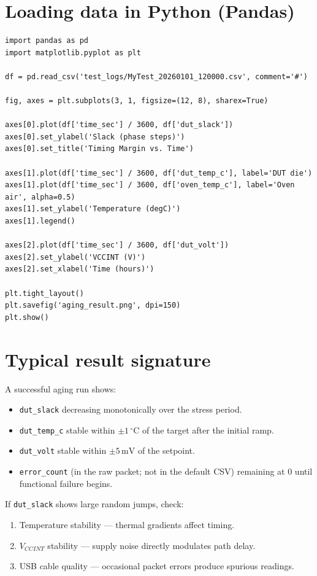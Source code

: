 \documentclass[12pt, a4paper]{report}
\begin{document}
\section{Loading data in Python (Pandas)}

\begin{lstlisting}[style=python, caption={Loading and plotting dut\_slack over time}]
import pandas as pd
import matplotlib.pyplot as plt

df = pd.read_csv('test_logs/MyTest_20260101_120000.csv', comment='#')

fig, axes = plt.subplots(3, 1, figsize=(12, 8), sharex=True)

axes[0].plot(df['time_sec'] / 3600, df['dut_slack'])
axes[0].set_ylabel('Slack (phase steps)')
axes[0].set_title('Timing Margin vs. Time')

axes[1].plot(df['time_sec'] / 3600, df['dut_temp_c'], label='DUT die')
axes[1].plot(df['time_sec'] / 3600, df['oven_temp_c'], label='Oven air', alpha=0.5)
axes[1].set_ylabel('Temperature (degC)')
axes[1].legend()

axes[2].plot(df['time_sec'] / 3600, df['dut_volt'])
axes[2].set_ylabel('VCCINT (V)')
axes[2].set_xlabel('Time (hours)')

plt.tight_layout()
plt.savefig('aging_result.png', dpi=150)
plt.show()
\end{lstlisting}

\section{Typical result signature}

A successful aging run shows:
\begin{itemize}
  \item \texttt{dut\_slack} decreasing monotonically over the stress period.
  \item \texttt{dut\_temp\_c} stable within $\pm 1\,^\circ$C of the target after the
        initial ramp.
  \item \texttt{dut\_volt} stable within $\pm 5\,\text{mV}$ of the setpoint.
  \item \texttt{error\_count} (in the raw packet; not in the default CSV) remaining at 0
        until functional failure begins.
\end{itemize}

If \texttt{dut\_slack} shows large random jumps, check:
\begin{enumerate}
  \item Temperature stability --- thermal gradients affect timing.
  \item $V_{CCINT}$ stability --- supply noise directly modulates path delay.
  \item USB cable quality --- occasional packet errors produce spurious readings.
\end{enumerate}
\end{document}
